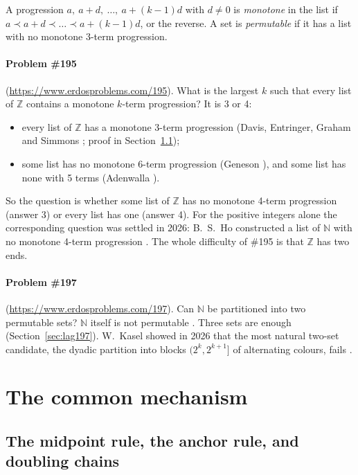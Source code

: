 \documentclass[11pt,letterpaper]{article}
\newcommand{\Z}{\mathbb{Z}}
\newcommand{\N}{\mathbb{N}}
\newcommand{\bef}{\prec}
\begin{document}
A progression $a,\ a+d,\ \dots,\ a+(k-1)d$ with $d \neq 0$ is \emph{monotone} in the list if
$a \bef a+d \bef \dots \bef a+(k-1)d$, or the reverse. A set is \emph{permutable} if it has a list with no
monotone 3-term progression.

\paragraph{Problem \#195} (\url{https://www.erdosproblems.com/195}). What is the largest $k$ such that every
list of $\Z$ contains a monotone $k$-term progression? It is 3 or 4:
\begin{itemize}
\item every list of $\Z$ has a monotone 3-term progression (Davis, Entringer, Graham and Simmons
\cite{DEGS}; proof in Section~\ref{sec:anchor});
\item some list has no monotone 6-term progression (Geneson \cite{Gen19}), and some list has none with 5
terms (Adenwalla \cite{Ade}).
\end{itemize}
So the question is whether some list of $\Z$ has no monotone 4-term progression (answer 3) or every list has
one (answer 4). For the positive integers alone the corresponding question was settled in 2026: B.~S.~Ho
constructed a list of $\N$ with no monotone 4-term progression \cite{Ho}. The whole difficulty of \#195 is
that $\Z$ has two ends.

\paragraph{Problem \#197} (\url{https://www.erdosproblems.com/197}). Can $\N$ be partitioned into two
permutable sets? $\N$ itself is not permutable \cite{DEGS}. Three sets are enough
(Section~\ref{sec:lag197}). W.~Kasel showed in 2026 that the most natural two-set candidate, the dyadic
partition into blocks $(2^k, 2^{k+1}]$ of alternating colours, fails \cite{Kasel}.

\section{The common mechanism}\label{sec:mech}

\subsection{The midpoint rule, the anchor rule, and doubling chains}\label{sec:anchor}
\end{document}
